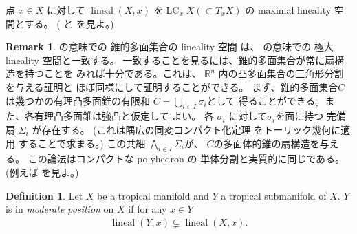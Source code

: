 \documentclass[a4paper,dvipdfmx,reqno,12pt]{amsart}
\theoremstyle{definition}
\newtheorem{definition}[theorem]{Definition}
\newtheorem{remark}[theorem]{Remark}
\newcommand{\opn}[1]{\operatorname{#1}}
\numberwithin{equation}{section}
\begin{document}
点 $x\in X$ に対して
$\opn{lineal}(X,x)$ を$\opn{LC}_x X (\subset T_x X)$
の maximal lineality 空間とする。
(\cite[]{MR4246795} と
\cite[]{demedrano2023chern} を見よ。)



\begin{remark}
\cite[]{MR3041763}の意味での
錐的多面集合の lineality 空間
は、
\cite[]{MR4246795}の意味での
極大 lineality 空間と一致する。
一致することを見るには、錐的多面集合が常に扇構造を持つことを
みれば十分である。これは、
$\mathbb{R}^{n}$ 内の凸多面集合の三角形分割を与える証明と
ほぼ同様にして証明することができる。
まず、錐的多面集合$C$は幾つかの有理凸多面錐の有限和
$C=\bigcup_{i\in I}\sigma_i$として
得ることができる。また、各有理凸多面錐は強凸と仮定して
よい。
各 $\sigma_i$ に対して$\sigma_i$を面に持つ
完備扇 $\Sigma_i$ が存在する。
(これは隅広の同変コンパクト化定理
\cite[Theorem 3]{MR337963}をトーリック幾何に適用
することで求まる。)
この共細 $\bigwedge_{i\in I}\Sigma_i$が、
$C$の多面体的錐の扇構造を与える。
この論法はコンパクトな polyhedron の
単体分割と実質的に同じである。
(例えば\cite[Theorem 2.11]{MR665919}
を見よ。)
\end{remark}

\begin{definition}
\label{definition-permissible-position}
Let $X$ be a tropical manifold and $Y$ a
tropical submanifold of $X$.
$Y$ is in \emph{moderate position} on $X$ if
for any $x\in Y$
\begin{align}
     \opn{lineal}(Y,x) \subsetneq
 \opn{lineal}(X,x).
\end{align}
\end{definition}
\end{document}
